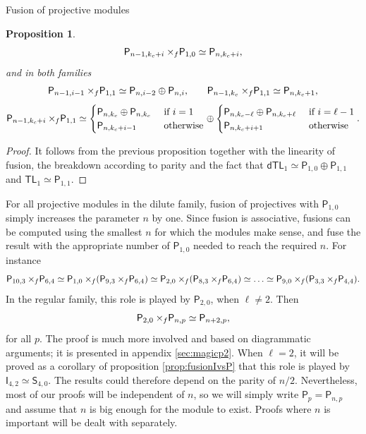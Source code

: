 \documentclass[reqno]{amsart}
\newtheorem{Prop}[Thm]{Proposition}
\newcommand{\dtl}[1]{\mathsf{dTL}_{#1}}
\newcommand{\tl}[1]{\mathsf{TL}_{#1}}
\newcommand{\ds}[1]{\mathsf S_{#1}}
\newcommand{\dl}[1]{\mathsf I_{#1}}
\newcommand{\dP}[1]{\mathsf P_{#1}}
\newcommand{\kc}{k_c}
\newcommand{\xf}{\times\hspace{-0.27em}_f}
\newcommand{\lc}{\ell}
\begin{document}
\begin{section}{Fusion of projective modules}
\begin{Prop}
\begin{equation}
 \dP{n-1,\kc +i} \xf\dP{1,0} \simeq \dP{n,\kc +i} \text{,}
\end{equation}
and in both families
\begin{equation}
\dP{n-1,i-1} \xf \dP{1,1} \simeq \dP{n,i-2} \oplus \dP{n,i}\text{,}\qquad \dP{n-1,\kc} \xf \dP{1,1} \simeq \dP{n,\kc +1} \text{,}
\end{equation}
\begin{equation}
\dP{n-1,\kc +i}\xf \dP{1,1} \simeq \begin{cases}
\dP{n,\kc} \oplus \dP{n,\kc} & \text{ if } i=1\\
\dP{n,\kc +i-1} & \text{ otherwise}
\end{cases} \oplus \begin{cases}
\dP{n,\kc -\lc} \oplus \dP{n,\kc + \lc} & \text{ if } i=\lc-1\\
 \dP{n,\kc+i+1} & \text{ otherwise}
 \end{cases}.
\end{equation}
\end{Prop}
\begin{proof}
It follows from the previous proposition together with the linearity of fusion, the breakdown according to parity and the fact that $\dtl{1} \simeq \dP{1,0} \oplus \dP{1,1}$ and $\tl{1} \simeq \dP{1,1}$.
\end{proof}
For all projective modules in the dilute family, fusion of projectives with $\dP{1,0}$ simply increases the parameter $n$ by one. Since fusion is associative, fusions can be computed using the smallest $n$ for which the modules make sense, and fuse the result with the appropriate number of $\dP{1,0}$ needed to reach the required $n$. For instance $$\dP{10,3} \xf \dP{6,4} \simeq \dP{1,0} \xf (\dP{9,3} \xf \dP{6,4}) \simeq \dP{2,0} \xf (\dP{8,3} \xf \dP{6,4}) \simeq \hdots \simeq \dP{9,0} \xf (\dP{3,3} \xf \dP{4,4}) .$$ In the regular family, this role is played by $\dP{2,0}$, when $\lc \neq 2$. Then
$$\dP{2,0}\xf \dP{n,p} \simeq \dP{n+2,p},  $$ for all $p$. The proof is much more involved and based on diagrammatic arguments; it is presented in appendix \ref{sec:magicp2}. When $\lc =2$, it will be proved as a corollary of proposition \ref{prop:fusionIvsP} that this role is played by $\dl{4,2} \simeq \ds{4,0}$. The results could therefore depend on the parity of $n/2$. Nevertheless, most of our proofs will be independent of $n$, so we will simply write $\dP{p} = \dP{n,p}$ and assume that $n$ is big enough for the module to exist. Proofs where $n$ is important will be dealt with separately.


\end{section}
\end{document}
